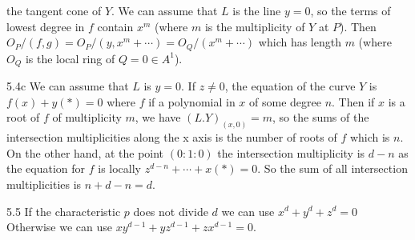 the tangent cone of $Y$. We can assume that $L$ is the
line $y=0$, so the terms of lowest degree in $f$ 
contain $x^m$ (where $m$ is the multiplicity of $Y$ at $P$). 
Then $O_P/(f,g)=O_P/(y,x^m+\cdots)=O_Q/(x^m+\cdots)$
which has length $m$ (where $O_Q$ is the local ring
of $Q=0\in A^1$). 
\item{5.4c} We can assume that $L$ is $y=0$. If $z\ne 0$,
the equation of the curve $Y$ is $f(x)+y(*)=0$ where
$f$ if a polynomial in $x$ of some degree $n$. Then if $x$
is a root of $f$ of multiplicity $m$, we have $(L.Y)_(x,0)=m$,
so the sums of the intersection multiplicities 
along the x axis is the number of roots of $f$ which is 
$n$. On the other hand, at the point $(0:1:0)$ the intersection
multiplicity is $d-n$ as the equation for
$f$ is locally $z^{d-n}+\cdots +x(*)=0$. So the sum of
all intersection multiplicities is $n+d-n=d$. 
\item{5.5} If the characteristic $p$ does not divide $d$ 
we can use $x^d+y^d+z^d=0$ Otherwise we can use $xy^{d-1} +
yz^{d-1}+zx^{d-1}=0$.


\bye